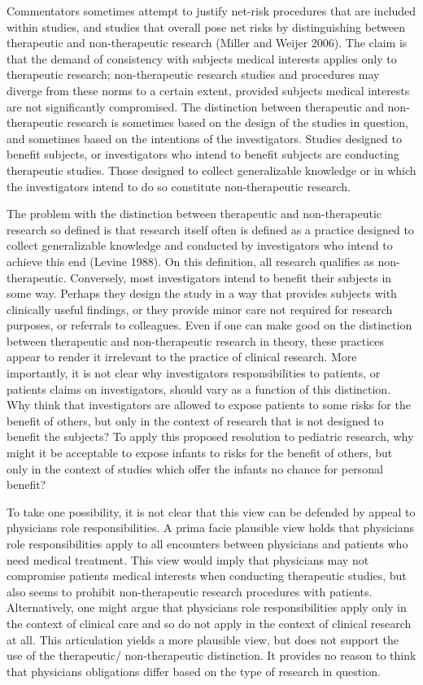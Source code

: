 \documentclass[12p]{article}
\begin{document}
Commentators sometimes attempt to justify net-risk procedures that are included within studies, and studies that overall pose net risks by distinguishing between therapeutic and non-therapeutic research (Miller and Weijer 2006). The claim is that the demand of consistency with subjects medical interests applies only to therapeutic research; non-therapeutic research studies and procedures may diverge from these norms to a certain extent, provided subjects medical interests are not significantly compromised. The distinction between therapeutic and non-therapeutic research is sometimes based on the design of the studies in question, and sometimes based on the intentions of the investigators. Studies designed to benefit subjects, or investigators who intend to benefit subjects are conducting therapeutic studies. Those designed to collect generalizable knowledge or in which the investigators intend to do so constitute non-therapeutic research.

The problem with the distinction between therapeutic and non-therapeutic research so defined is that research itself often is defined as a practice designed to collect generalizable knowledge and conducted by investigators who intend to achieve this end (Levine 1988). On this definition, all research qualifies as non-therapeutic. Conversely, most investigators intend to benefit their subjects in some way. Perhaps they design the study in a way that provides subjects with clinically useful findings, or they provide minor care not required for research purposes, or referrals to colleagues. Even if one can make good on the distinction between therapeutic and non-therapeutic research in theory, these practices appear to render it irrelevant to the practice of clinical research. More importantly, it is not clear why investigators responsibilities to patients, or patients claims on investigators, should vary as a function of this distinction. Why think that investigators are allowed to expose patients to some risks for the benefit of others, but only in the context of research that is not designed to benefit the subjects? To apply this proposed resolution to pediatric research, why might it be acceptable to expose infants to risks for the benefit of others, but only in the context of studies which offer the infants no chance for personal benefit?

To take one possibility, it is not clear that this view can be defended by appeal to physicians role responsibilities. A prima facie plausible view holds that physicians role responsibilities apply to all encounters between physicians and patients who need medical treatment. This view would imply that physicians may not compromise patients medical interests when conducting therapeutic studies, but also seems to prohibit non-therapeutic research procedures with patients. Alternatively, one might argue that physicians role responsibilities apply only in the context of clinical care and so do not apply in the context of clinical research at all. This articulation yields a more plausible view, but does not support the use of the therapeutic/ non-therapeutic distinction. It provides no reason to think that physicians obligations differ based on the type of research in question.
\end{document}
